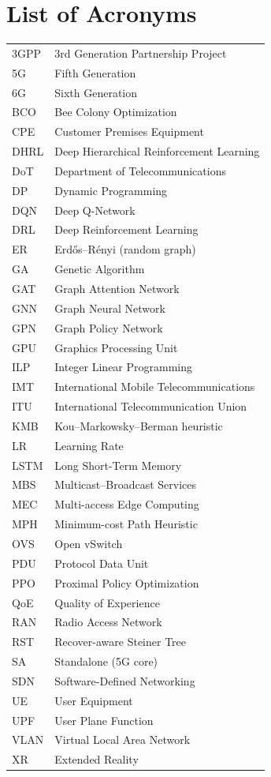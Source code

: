 \chapter*{List of Acronyms}



\begin{longtable}{ll}

3GPP & 3rd Generation Partnership Project\\
5G & Fifth Generation\\
6G & Sixth Generation\\
BCO & Bee Colony Optimization\\
CPE & Customer Premises Equipment\\
DHRL & Deep Hierarchical Reinforcement Learning\\
DoT & Department of Telecommunications\\
DP & Dynamic Programming\\
DQN & Deep Q-Network\\
DRL & Deep Reinforcement Learning\\
ER & Erd\H{o}s--R\'enyi (random graph)\\
GA & Genetic Algorithm\\
GAT & Graph Attention Network\\
GNN & Graph Neural Network\\
GPN & Graph Policy Network\\
GPU & Graphics Processing Unit\\
ILP & Integer Linear Programming\\
IMT & International Mobile Telecommunications\\
ITU & International Telecommunication Union\\
KMB & Kou--Markowsky--Berman heuristic\\
LR & Learning Rate\\
LSTM & Long Short-Term Memory\\
MBS & Multicast--Broadcast Services\\
MEC & Multi-access Edge Computing\\
MPH & Minimum-cost Path Heuristic\\
OVS & Open vSwitch\\
PDU & Protocol Data Unit\\
PPO & Proximal Policy Optimization\\
QoE & Quality of Experience\\
RAN & Radio Access Network\\
RST & Recover-aware Steiner Tree\\
SA & Standalone (5G core)\\
SDN & Software-Defined Networking\\
UE & User Equipment\\
UPF & User Plane Function\\
VLAN & Virtual Local Area Network\\
XR & Extended Reality\\

\end{longtable}
